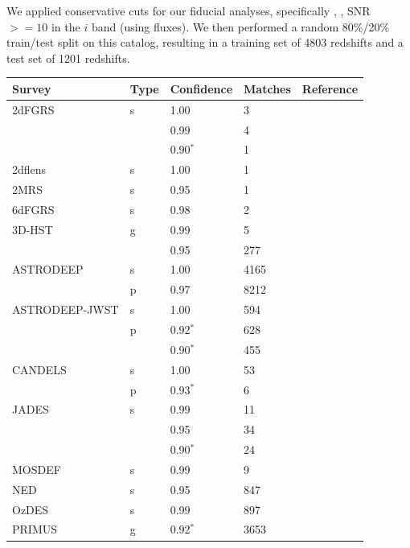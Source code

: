 We applied conservative cuts for our fiducial analyses, specifically , , SNR $>= 10$ in the $i$ band (using  fluxes).
We then performed a random 80\%/20\% train/test split on this catalog, resulting in a training set of 4803 redshifts and a test set of 1201 redshifts.

\begin{table}[!p]
    \centering
    \begin{tabular}{lllll}
        \hline
        Survey & Type & Confidence & Matches& Reference \\
        \hline
        \hline
        2dFGRS & s & 1.00 & 3 & \citet{colless2001} \\
               &   & 0.99 & 4 & \\
               &   & 0.90$^{*}$ & 1 & \\
        2dflens & s & 1.00 & 1 & \citet{blake2016} \\
        2MRS & s & 0.95 & 1 & \citet{huchra2012} \\
        6dFGRS & s & 0.98 & 2 & \citet{jones2009} \\
        3D-HST & g & 0.99 & 5 & \citet{momcheva2016} \\
               &   & 0.95 & 277 & \\
        ASTRODEEP & s & 1.00 & 4165 & \citet{merlin2021} \\
                  & p & 0.97 & 8212 & \\
        ASTRODEEP-JWST & s & 1.00 & 594 & \citet{merlin2024} \\
                       & p & 0.92$^{*}$ & 628 & \\
                       &   & 0.90$^{*}$ & 455 & \\
        CANDELS & s & 1.00 & 53 & \citet{kodra2023} \\
                & p & 0.93$^{*}$ & 6 & \\
        JADES & s & 0.99 & 11 & \citet{deugenio2025} \\
              &   & 0.95 & 34 & \\
              &   & 0.90$^{*}$ & 24 & \\
        MOSDEF & s & 0.99 & 9 & \citet{kriek2015} \\
        NED & s & 0.95 & 847 & \citet{helou1991} \\
        OzDES & s & 0.99 & 897 & \citet{lidman2020} \\
        PRIMUS & g & 0.92$^{*}$ & 3653 & \citet{cool2013} \\

\end{tabular}
\end{table}
